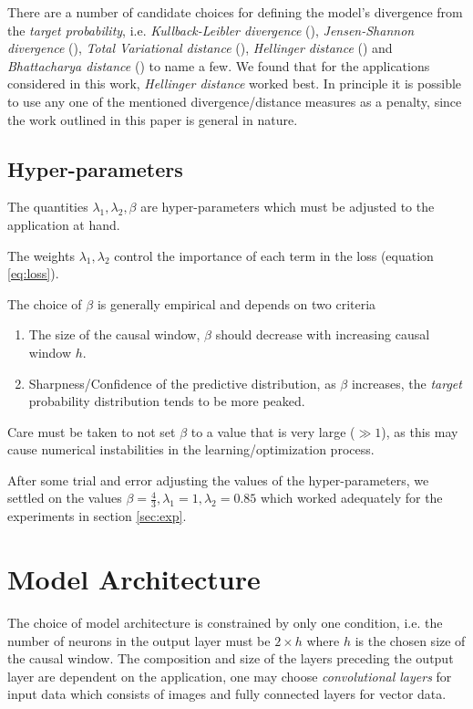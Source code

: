 \documentclass[twoside]{article}
\begin{document}
There are a number of candidate choices for defining the model's divergence from the \emph{target probability}, i.e.  \emph{Kullback-Leibler divergence} (\cite{kullback1951}), \emph{Jensen-Shannon divergence} (\cite{jensen-shannon}), \emph{Total Variational distance} (\cite{Villani2009}), \emph{Hellinger distance} (\cite{hellinger}) and \emph{Bhattacharya distance} (\cite{bhattacharyya}) to name a few. We found that for the applications considered in this work, \emph{Hellinger distance} worked best. In principle it is possible to use any one of the mentioned divergence/distance measures as a penalty, since the work outlined in this paper is general in nature.

\subsection{Hyper-parameters}

The quantities $\lambda_1, \lambda_2, \beta$ are hyper-parameters which must be adjusted to the application at hand.

The weights $\lambda_1, \lambda_2$ control the importance of each term in the loss (equation \ref{eq:loss}).

The choice of $\beta$ is generally empirical and depends on two criteria 
\begin{enumerate} \item The size of the causal window, $\beta$ should decrease with increasing causal window $h$. 
\item Sharpness/Confidence of the predictive distribution, as $\beta$ increases, the \emph{target} probability distribution tends to be more peaked.  \end{enumerate}

Care must be taken to not set $\beta$ to a value that is very large ($\gg 1$), as this may cause numerical instabilities in the learning/optimization process. 

After some trial and error adjusting the values of the hyper-parameters, we settled on the values $\beta = \frac{4}{3}, \lambda_1 = 1, \lambda_2 = 0.85$ which worked adequately for the experiments in section \ref{sec:exp}.

\section{Model Architecture}

The choice of model architecture is constrained by only one condition, i.e. the number of neurons in the output layer must be $2 \times h$ where $h$ is the chosen size of the causal window. The composition and size of the layers preceding the output layer are dependent on the application, one may choose \emph{convolutional layers} for input data which consists of images and fully connected layers for vector data.
\end{document}
